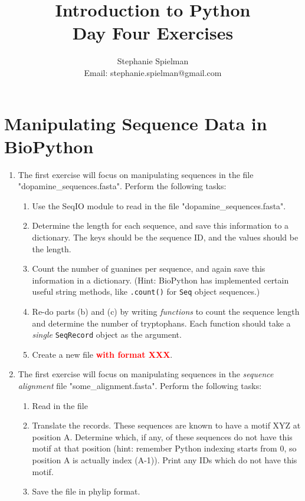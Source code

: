 \documentclass{article}[12pt]
\newcommand{\code}[1]{\texttt{#1}}  %
\begin{document}
\title{Introduction to Python \\ Day Four Exercises}
\author{Stephanie Spielman \\ \footnotesize{Email: stephanie.spielman@gmail.com}}
\date{}
\maketitle{}

\section{Manipulating Sequence Data in BioPython}


\begin{enumerate}[itemsep=5ex]

	\item The first exercise will focus on manipulating sequences in the file "dopamine\_sequences.fasta". Perform the following tasks:
	
	\begin{enumerate}[itemsep=2ex]
		\item Use the SeqIO module to read in the file "dopamine\_sequences.fasta".
		\item Determine the length for each sequence, and save this information to a dictionary. The keys should be the sequence ID, and the values should be the length.
		\item Count the number of guanines per sequence, and again save this information in a dictionary. (Hint: BioPython has implemented certain useful string methods, like \code{.count()} for \code{Seq} object sequences.)
		\item Re-do parts (b) and (c) by writing \emph{functions} to count the sequence length and determine the number of tryptophans. Each function should take a \emph{single} \code{SeqRecord} object as the argument.
		\item Create a new file \textcolor{red}{\textbf{with format XXX}}.
		
		
	\end{enumerate}
	
	\item The first exercise will focus on manipulating sequences in the \emph{sequence alignment} file "some\_alignment.fasta". Perform the following tasks:
		
	\begin{enumerate}[itemsep=2ex]
		\item Read in the file 
		\item Translate the records. These sequences are known to have a motif XYZ at position A. Determine which, if any, of these sequences do not have this motif at that position (hint: remember Python indexing starts from 0, so position A is actually index (A-1)). Print any IDs which do not have this motif.
		\item Save the file in phylip format. 			
			
		\end{enumerate}
	
\end{enumerate}	
	







\end{document}
